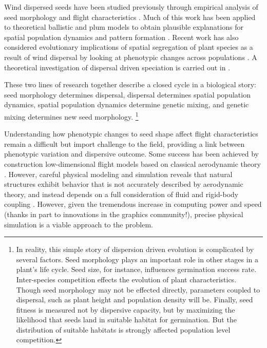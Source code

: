 \documentclass[annual]{acmsiggraph}
\begin{document}
Wind dispersed seeds have been studied previously through empirical analysis of seed morphology and flight characteristics \cite{augspurger1986}.  Much of this work has been applied to  theoretical ballistic and plum models  to obtain plausible explanations for spatial population dynamics and pattern formation \cite{levin2003}. Recent work has also considered  evolutionary implications of spatial segregation of  plant species as a result of wind dispersal by looking at phenotypic changes across  populations \cite{Cheptou2008}.   A theoretical investigation of dispersal driven speciation is carried out in \cite{levin2010}. 

These two lines of research together  describe a closed cycle in a biological story: seed morphology determines  dispersal, dispersal determines spatial population dynamics, spatial population dynamics determine genetic mixing, and genetic mixing determines new seed morphology.  \footnote{In reality, this simple story of dispersion driven evolution is complicated by several factors. Seed morphology  plays an important  role in  other stages in a plant's life cycle. Seed size, for instance, influences germination success rate.  Inter-species competition effects  the evolution of plant characteristics.   Though seed morphology may not be effected directly, parameters coupled to dispersal, such as plant height and population density will be.  Finally, seed fitness is measured not by dispersive capacity, but by maximizing the likelihood that  seeds land in suitable habitat for germination.  But the distribution of suitable habitats is strongly affected population level competition. }  


Understanding how phenotypic changes to seed shape affect  flight characteristics remain a difficult but import challenge to the field, providing a link between phenotypic variation and dispersive outcome.  Some success has been achieved by construction low-dimensional flight models based on classical aerodynamic theory \cite{greene2005}.  However, careful physical modeling and simulation reveals that natural structures exhibit behavior that is not accurately described by aerodynamic theory, and instead depends on a full consideration of fluid and rigid-body coupling \cite{wang2005}\cite{wang2012}.   However, given the tremendous increase in computing power and speed (thanks in part to innovations in the graphics community!),  precise physical simulation is a viable approach to the problem. 
\end{document}
